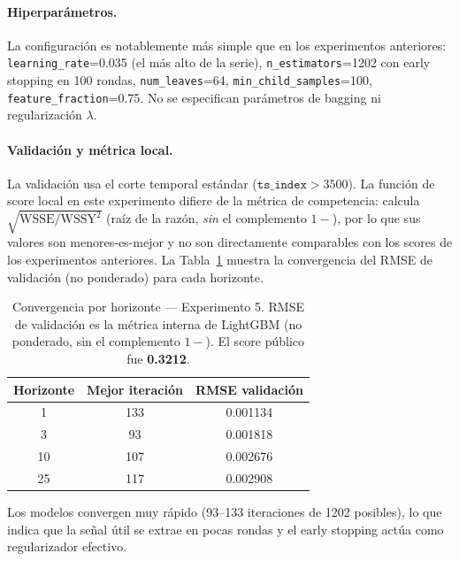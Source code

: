 \documentclass{article}
\begin{document}
\paragraph{Hiperparámetros.}
La configuración es notablemente más simple que en los experimentos anteriores: \texttt{learning\_rate}=0.035 (el más alto de la serie), \texttt{n\_estimators}=1202 con early stopping en 100 rondas, \texttt{num\_leaves}=64, \texttt{min\_child\_samples}=100, \texttt{feature\_fraction}=0.75. No se especifican parámetros de bagging ni regularización $\lambda$.

\paragraph{Validación y métrica local.}
La validación usa el corte temporal estándar ($\texttt{ts\_index} > 3500$). La función de score local en este experimento difiere de la métrica de competencia: calcula $\sqrt{\text{WSSE}/\text{WSSY}^2}$ (raíz de la razón, \emph{sin} el complemento $1-$), por lo que sus valores son menores-es-mejor y no son directamente comparables con los scores de los experimentos anteriores. La Tabla~\ref{tab:exp5_conv} muestra la convergencia del RMSE de validación (no ponderado) para cada horizonte.

\begin{table}[h!]
  \caption{Convergencia por horizonte — Experimento 5. RMSE de validación es la métrica interna de LightGBM (no ponderado, sin el complemento $1-$). El score público fue \textbf{0.3212}.}
  \label{tab:exp5_conv}
  \centering
  \begin{tabular}{ccc}
    \toprule
    Horizonte & Mejor iteración & RMSE validación \\
    \midrule
    1  & 133 & 0.001134 \\
    3  &  93 & 0.001818 \\
    10 & 107 & 0.002676 \\
    25 & 117 & 0.002908 \\
    \bottomrule
  \end{tabular}
\end{table}

Los modelos convergen muy rápido (93--133 iteraciones de 1202 posibles), lo que indica que la señal útil se extrae en pocas rondas y el early stopping actúa como regularizador efectivo.
\end{document}
